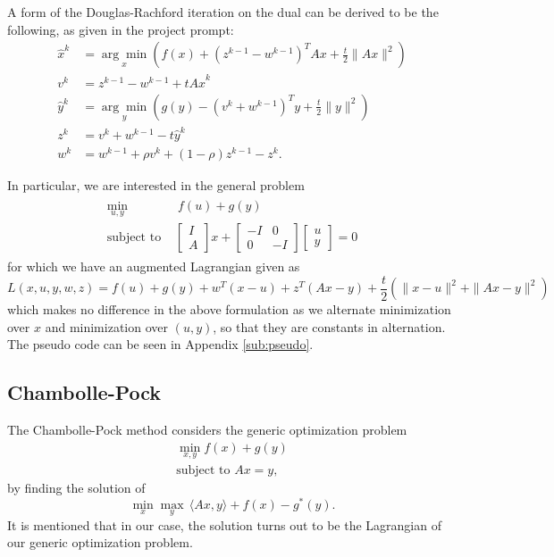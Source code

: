 \documentclass{article}
\theoremstyle{definition}
\theoremstyle{remark}
\begin{document}
\medskip

A form of the Douglas-Rachford iteration on the dual can be derived to be the following, as given in the project prompt:
\begin{align*}
\hat{x}^k &= \underset{x}{\arg \min} \left( f(x) + (z^{k-1} - w^{k-1})^T Ax + \frac{t}{2} \|Ax \|^2 \right) \\
v^k &= z^{k-1} - w^{k-1} + tA \hat{x}^k \\
\hat{y}^k &= \underset{y}{\arg \min} \left( g(y) -(v^k + w^{k-1})^T y + \frac{t}{2} \|y \|^2 \right) \\
z^k &= v^k + w^{k-1} - t \hat{y}^k\\
w^k &= w^{k-1}+ \rho v^k + (1-\rho)z^{k-1} - z^k.
\end{align*}

In particular, we are interested in the general problem
\begin{align*}
    \begin{split}
        \min_{u,y}& \: f(u) + g(y)\\ 
        \text{subject to }&
        \begin{bmatrix}
            I \\
            A
        \end{bmatrix} x + 
        \begin{bmatrix}
            -I & 0 \\
            0 & -I
        \end{bmatrix}
        \begin{bmatrix}
            u \\
            y
        \end{bmatrix} = 0
    \end{split}
\end{align*}
for which we have an augmented Lagrangian given as
$$
L(x,u, y, w, z) = f(u) + g(y) + w^T (x-u) + z^T (Ax-y) + \frac{t}{2} \left( \| x-u\|^2 + \|Ax-y\|^2 \right)
$$
which makes no difference in the above formulation as we alternate minimization over $x$ and minimization over $(u, y)$, so that they are constants in alternation. The pseudo code can be seen in Appendix \ref{sub:pseudo}.

\subsection{Chambolle-Pock}%
  \label{sub:Chambolle-Pock}

The Chambolle-Pock method considers the generic optimization problem 
\begin{equation*}
  \begin{split}
    \min_{x,y} f(x) + g(y)\\ 
    \text{subject to }Ax= y,
  \end{split}
\end{equation*}
by finding the solution of
\begin{equation}
 \min_{x}\max_{y} \, \langle Ax, y \rangle + f(x) - g^{*}(y). \label{eq: CP_minmax}
\end{equation}
It is mentioned that in our case, the solution turns out to be the Lagrangian of our generic optimization problem. 
\end{document}

